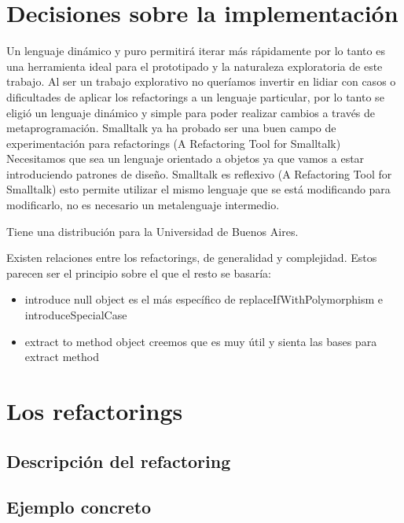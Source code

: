 \section{Decisiones sobre la implementación}

Un lenguaje dinámico y puro permitirá iterar más rápidamente por lo tanto es una herramienta ideal
para el prototipado y la naturaleza exploratoria de este trabajo.
Al ser un trabajo explorativo no queríamos invertir en lidiar con casos o dificultades de aplicar
los refactorings a un lenguaje particular, por lo tanto se eligió un lenguaje dinámico y simple para
poder realizar cambios a través de metaprogramación.
Smalltalk ya ha probado ser una buen campo de experimentación para refactorings (A Refactoring Tool for Smalltalk)
Necesitamos que sea un lenguaje orientado a objetos ya que vamos a estar introduciendo patrones de diseño.
Smalltalk es reflexivo (A Refactoring Tool for Smalltalk) esto permite utilizar el mismo lenguaje
que se está modificando para modificarlo, no es necesario un metalenguaje intermedio.

Tiene una distribución para la Universidad de Buenos Aires.

Existen relaciones entre los refactorings, de generalidad y complejidad. Estos parecen ser el
principio sobre el que el resto se basaría:

\begin{itemize}
    \item introduce null object es el más específico de replaceIfWithPolymorphism e
    introduceSpecialCase
    \item extract to method object creemos que es muy útil y sienta las bases para extract method
\end{itemize}



\section{Los refactorings}

\subsection{Descripción del refactoring}
\subsection{Ejemplo concreto}

